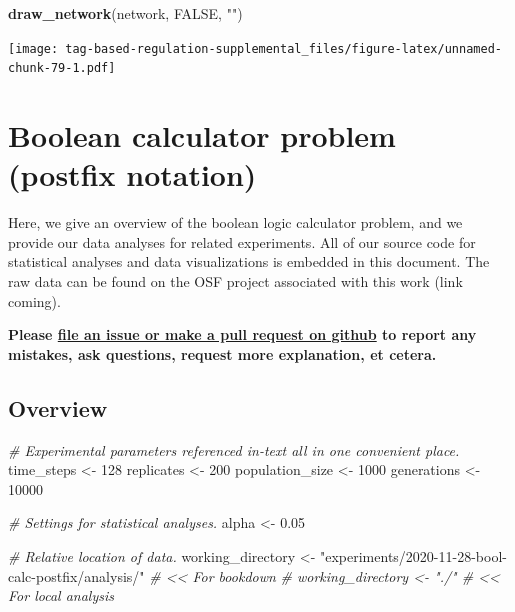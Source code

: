 \documentclass[
]{book}
\newenvironment{Shaded}{\begin{snugshade}}{\end{snugshade}}
\newcommand{\CommentTok}[1]{\textcolor[rgb]{0.56,0.35,0.01}{\textit{#1}}}
\newcommand{\DecValTok}[1]{\textcolor[rgb]{0.00,0.00,0.81}{#1}}
\newcommand{\FloatTok}[1]{\textcolor[rgb]{0.00,0.00,0.81}{#1}}
\newcommand{\KeywordTok}[1]{\textcolor[rgb]{0.13,0.29,0.53}{\textbf{#1}}}
\newcommand{\NormalTok}[1]{#1}
\newcommand{\OtherTok}[1]{\textcolor[rgb]{0.56,0.35,0.01}{#1}}
\newcommand{\StringTok}[1]{\textcolor[rgb]{0.31,0.60,0.02}{#1}}
\begin{document}
\begin{Shaded}
\begin{Highlighting}[]
\KeywordTok{draw\_network}\NormalTok{(network, }\OtherTok{FALSE}\NormalTok{, }\StringTok{""}\NormalTok{)}
\end{Highlighting}
\end{Shaded}

\texttt{[image: tag-based-regulation-supplemental\_files/figure-latex/unnamed-chunk-79-1.pdf]}

\hypertarget{boolean-calculator-problem-postfix-notation}{%
\chapter{Boolean calculator problem (postfix notation)}\label{boolean-calculator-problem-postfix-notation}}

Here, we give an overview of the boolean logic calculator problem, and we provide our data analyses for related experiments.
All of our source code for statistical analyses and data visualizations is embedded in this document.
The raw data can be found on the OSF project associated with this work (link coming).

\textbf{Please \href{https://github.com/amlalejini/Tag-based-Genetic-Regulation-for-LinearGP/issues}{file an issue or make a pull request on github} to report any mistakes, ask questions, request more explanation, et cetera.}

\hypertarget{overview-4}{%
\section{Overview}\label{overview-4}}

\begin{Shaded}
\begin{Highlighting}[]
\CommentTok{\# Experimental parameters referenced in{-}text all in one convenient place.}
\NormalTok{time\_steps \textless{}{-}}\StringTok{ }\DecValTok{128}
\NormalTok{replicates \textless{}{-}}\StringTok{ }\DecValTok{200}
\NormalTok{population\_size \textless{}{-}}\StringTok{ }\DecValTok{1000}
\NormalTok{generations \textless{}{-}}\StringTok{ }\DecValTok{10000}

\CommentTok{\# Settings for statistical analyses.}
\NormalTok{alpha \textless{}{-}}\StringTok{ }\FloatTok{0.05}

\CommentTok{\# Relative location of data.}
\NormalTok{working\_directory \textless{}{-}}\StringTok{ "experiments/2020{-}11{-}28{-}bool{-}calc{-}postfix/analysis/"} \CommentTok{\# \textless{}\textless{} For bookdown}
\CommentTok{\# working\_directory \textless{}{-} "./"                                              \# \textless{}\textless{} For local analysis}
\end{Highlighting}
\end{Shaded}
\end{document}

